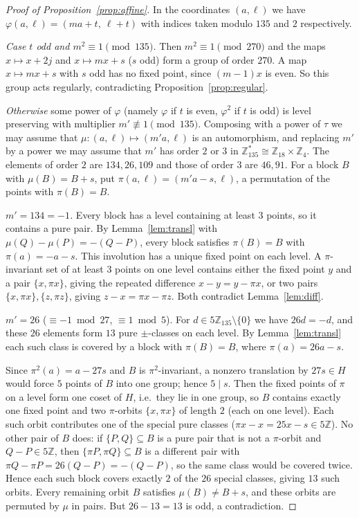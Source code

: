 \documentclass[11pt]{article}
\theoremstyle{remark}
\newcommand{\Z}{\mathbb{Z}}
\begin{document}
\begin{proof}[Proof of Proposition~\ref{prop:affine}]
In the coordinates $(a,\ell)$ we have $\varphi(a,\ell)=(ma+t,\ \ell+t)$ with indices taken modulo $135$
and $2$ respectively.

\emph{Case $t$ odd and $m^2\equiv1\pmod{135}$.}  Then $m^2\equiv1\pmod{270}$ and the maps
$x\mapsto x+2j$ and $x\mapsto mx+s$ ($s$ odd) form a group of order $270$.  A map $x\mapsto mx+s$ with
$s$ odd has no fixed point, since $(m-1)x$ is even.  So this group acts regularly, contradicting
Proposition~\ref{prop:regular}.

\emph{Otherwise} some power of $\varphi$ (namely $\varphi$ if $t$ is even, $\varphi^2$ if $t$ is odd)
is level preserving with multiplier $m'\not\equiv1\pmod{135}$.  Composing with a power of $\tau$ we may
assume that $\mu\colon(a,\ell)\mapsto(m'a,\ell)$ is an automorphism, and replacing $m'$ by a power we
may assume that $m'$ has order $2$ or $3$ in $\Z_{135}^{*}\cong\Z_{18}\times\Z_4$.  The elements of
order $2$ are $134,26,109$ and those of order $3$ are $46,91$.  For a block $B$ with
$\mu(B)=B+s$, put $\pi(a,\ell)=(m'a-s,\ell)$, a permutation of the points with $\pi(B)=B$.

\smallskip\noindent\emph{$m'=134=-1$.}  Every block has a level containing at least $3$ points, so it
contains a pure pair.  By Lemma~\ref{lem:transl} with $\mu(Q)-\mu(P)=-(Q-P)$, every block satisfies
$\pi(B)=B$ with $\pi(a)=-a-s$.  This involution has a unique fixed point on each level.  A
$\pi$-invariant set of at least $3$ points on one level contains either the fixed point $y$ and a pair
$\{x,\pi x\}$, giving the repeated difference $x-y=y-\pi x$, or two pairs $\{x,\pi x\},\{z,\pi z\}$,
giving $z-x=\pi x-\pi z$.  Both contradict Lemma~\ref{lem:diff}.

\smallskip\noindent\emph{$m'=26$} ($\equiv-1 \bmod 27$, $\equiv1\bmod 5$).  For $d\in 5\Z_{135}\setminus\{0\}$ we
have $26d=-d$, and these $26$ elements form $13$ pure $\pm$-classes on each level.  By
Lemma~\ref{lem:transl} each such class is covered by a block with $\pi(B)=B$, where
$\pi(a)=26a-s$.

Since $\pi^2(a)=a-27s$ and $B$ is $\pi^2$-invariant, a nonzero translation by $27s\in H$ would force
$5$ points of $B$ into one group; hence $5\mid s$.  Then the fixed points of $\pi$ on a level form one
coset of $H$, i.e.\ they lie in one group, so $B$ contains exactly one fixed point and two
$\pi$-orbits $\{x,\pi x\}$ of length $2$ (each on one level).  Each such orbit contributes one of the
special pure classes ($\pi x-x=25x-s\in5\Z$).  No other pair of $B$ does: if $\{P,Q\}\subseteq B$ is a
pure pair that is not a $\pi$-orbit and $Q-P\in5\Z$, then $\{\pi P,\pi Q\}\subseteq B$ is a different pair
with $\pi Q-\pi P=26(Q-P)=-(Q-P)$, so the same class would be covered twice.  Hence each such block covers exactly $2$ of the $26$ special classes, giving $13$
such orbits.  Every remaining orbit $B$ satisfies $\mu(B)\neq B+s$, and these orbits are permuted by
$\mu$ in pairs.  But $26-13=13$ is odd, a contradiction.


\end{proof}
\end{document}
